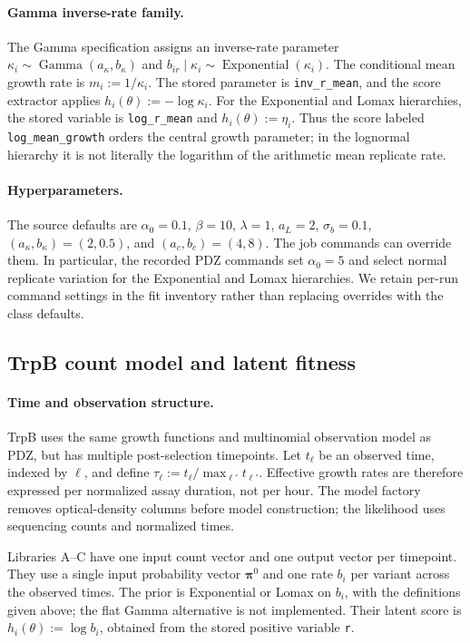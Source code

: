 \paragraph{Gamma inverse-rate family.}
The Gamma specification assigns an inverse-rate parameter
$\kappa_i\sim\operatorname{Gamma}(a_\kappa,b_\kappa)$ and
$b_{ir}\mid\kappa_i\sim\operatorname{Exponential}(\kappa_i)$.
The conditional mean growth rate is $m_i:=1/\kappa_i$. The stored
parameter is \texttt{inv\_r\_mean}, and the score extractor applies
$h_i(\theta):=-\log\kappa_i$. For the Exponential and Lomax hierarchies,
the stored variable is \texttt{log\_r\_mean} and
$h_i(\theta):=\eta_i$. Thus the score labeled \texttt{log\_mean\_growth}
orders the central growth parameter; in the lognormal hierarchy it is not
literally the logarithm of the arithmetic mean replicate rate.

\paragraph{Hyperparameters.}
The source defaults are $\alpha_0=0.1$, $\beta=10$, $\lambda=1$,
$a_L=2$, $\sigma_b=0.1$, $(a_\kappa,b_\kappa)=(2,0.5)$, and
$(a_c,b_c)=(4,8)$. The job commands can override them. In particular,
the recorded PDZ commands set $\alpha_0=5$ and select normal replicate
variation for the Exponential and Lomax hierarchies. We retain per-run
command settings in the fit inventory rather than replacing overrides with
the class defaults.

\subsection{TrpB count model and latent fitness}
\label{app:trpb-model}

\paragraph{Time and observation structure.}
TrpB uses the same growth functions and multinomial observation model as
PDZ, but has multiple post-selection timepoints. Let $t_\ell$ be an
observed time, indexed by $\ell$, and define
$\tau_\ell:=t_\ell/\max_{\ell'}t_{\ell'}$. Effective growth rates are
therefore expressed per normalized assay duration, not per hour. The model
factory removes optical-density columns before model construction; the
likelihood uses sequencing counts and normalized times.

Libraries A--C have one input count vector and one output vector per timepoint.
They use a single input probability vector $\boldsymbol\pi^0$ and one rate
$b_i$ per variant across the observed times. The prior is Exponential or
Lomax on $b_i$, with the definitions given above; the flat Gamma alternative
is not implemented. Their latent score is $h_i(\theta):=\log b_i$, obtained
from the stored positive variable \texttt{r}.

